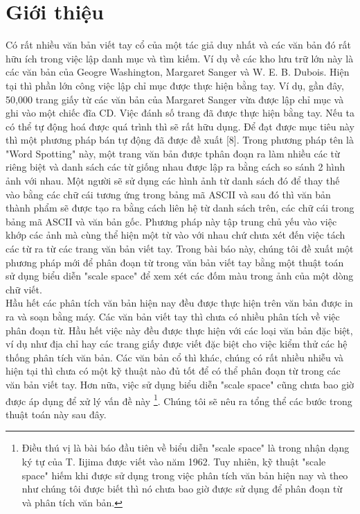 \documentclass[a4paper]{article}
\begin{document}
\section{Giới thiệu}
Có rất nhiều văn bản viết tay cổ của một tác giả duy nhất và các văn bản đó rất hữu ích trong việc lập danh mục và tìm kiếm. Ví dụ về các kho lưu trữ lớn này là các văn bản của Geogre Washington, Margaret Sanger và W. E. B. Dubois. Hiện tại thì phần lớn công việc lập chỉ mục được thực hiện bằng tay. Ví dụ, gần đây, 50,000 trang giấy từ các văn bản của Margaret Sanger vừa được lập chỉ mục và ghi vào một chiếc đĩa CD. Việc đánh số trang đã được thực hiện bằng tay. Nếu ta có thể tự động hoá được quá trình thì sẽ rất hữu dụng. Để đạt được mục tiêu này thì một phương pháp bán tự động đã được đề xuất [8]. Trong phương pháp tên là "Word Spotting" này, một trang văn bản được tphân đoạn ra làm nhiều các từ riêng biệt và danh sách các từ giống nhau được lập ra bằng cách so sánh 2 hình ảnh với nhau. Một người sẽ sử dụng các hình ảnh từ danh sách đó để thay thế vào bằng các chữ cái tương ứng trong bảng mã ASCII và sau đó thì văn bản thành phẩm sẽ được tạo ra bằng cách liên hệ từ danh sách trên, các chữ cái trong bảng mã ASCII và văn bản gốc. Phương pháp này tập trung chủ yếu vào việc khớp các ảnh mà cùng thể hiện một từ vào với nhau chứ chưa xét đến việc tách các từ ra từ các trang văn bản viết tay. Trong bài báo này, chúng tôi đề xuất một phương pháp mới để phân đoạn từ trong văn bản viết tay bằng một thuật toán sử dụng biểu diễn "scale space" để xem xét các đốm màu trong ảnh của một dòng chữ viết.\\
Hầu hết các phân tích văn bản hiện nay đều được thực hiện trên văn bản được in ra và soạn bằng máy. Các văn bản viết tay thì chưa có nhiều phân tích về việc phân đoạn từ. Hầu hết việc này đều được thực hiện với các loại văn bản đặc biệt, ví dụ như địa chỉ hay các trang giấy được viết đặc biệt cho việc kiểm thử các hệ thống phân tích văn bản. Các văn bản cổ thì khác, chúng có rất nhiều nhiễu và hiện tại thì chưa có một kỹ thuật nào đủ tốt để có thể phân đoạn từ trong các văn bản viết tay. Hơn nữa, việc sử dụng biểu diễn "scale space" cũng chưa bao giờ được áp dụng để xử lý vấn đề này \footnote{Điều thú vị là bài báo đầu tiên về biểu diễn "scale space" là trong nhận dạng ký tự của T. Iijima được viết vào năm 1962. Tuy nhiên, kỹ thuật "scale space" hiếm khi được sử dụng trong việc phân tích văn bản hiện nay và theo như chúng tôi được biết thì nó chưa bao giờ được sử dụng để phân đoạn từ và phân tích văn bản.}. Chúng tôi sẽ nêu ra tổng thể các bước trong thuật toán này sau đây.\\
\end{document}
